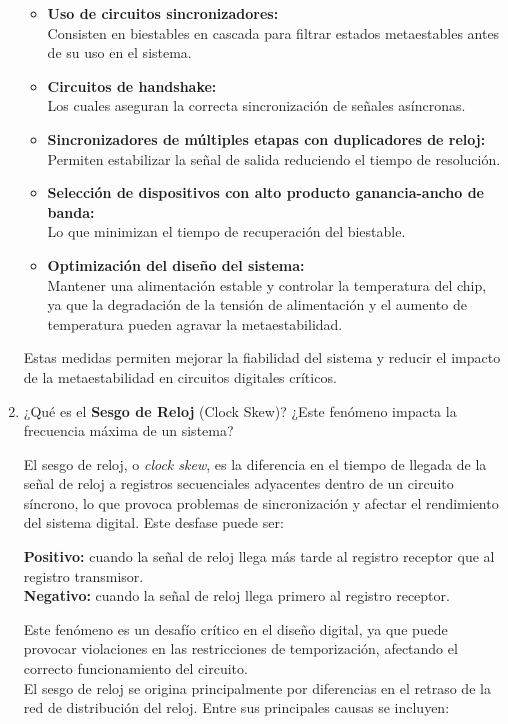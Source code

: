 \documentclass[12pt,letterpaper]{article}
\begin{document}
\begin{enumerate}
  \begin{itemize}
  \item \textbf{Uso de circuitos sincronizadores:}\\
    Consisten en biestables en cascada para filtrar estados metaestables antes de su uso en el sistema.
  \item \textbf{Circuitos de handshake:}\\
    Los cuales aseguran la correcta sincronización de señales asíncronas.
  \item \textbf{Sincronizadores de múltiples etapas con duplicadores de reloj:}\\
    Permiten estabilizar la señal de salida reduciendo el tiempo de resolución.
  \item \textbf{Selección de dispositivos con alto producto ganancia-ancho de banda:} \\
    Lo que minimizan el tiempo de recuperación del biestable.
  \item \textbf{Optimización del diseño del sistema:}\\
    Mantener una alimentación estable y controlar la temperatura del chip, ya que la degradación de la tensión de alimentación y el aumento de temperatura pueden agravar la metaestabilidad.
  \end{itemize}
  
  Estas medidas permiten mejorar la fiabilidad del sistema y reducir el impacto de la metaestabilidad en circuitos digitales críticos.
  
  \bigskip
  
\item ¿Qué es el \textbf{Sesgo de Reloj} (Clock Skew)? ¿Este fenómeno impacta la frecuencia máxima de un sistema?
    \bigskip

    El sesgo de reloj, o \textit{clock skew}, es la diferencia en el tiempo de llegada de la señal de reloj a registros secuenciales adyacentes dentro de un circuito síncrono, lo que provoca problemas de sincronización y afectar el rendimiento del sistema digital. Este desfase puede ser:
    
    \textbf{Positivo:} cuando la señal de reloj llega más tarde al registro receptor que al registro transmisor.\\
    \textbf{Negativo:} cuando la señal de reloj llega primero al registro receptor.
    
    Este fenómeno es un desafío crítico en el diseño digital, ya que puede provocar violaciones en las restricciones de temporización, afectando el correcto funcionamiento del circuito.\\
    El sesgo de reloj se origina principalmente por diferencias en el retraso de la red de distribución del reloj. Entre sus principales causas se incluyen:


\end{enumerate}
\end{document}
